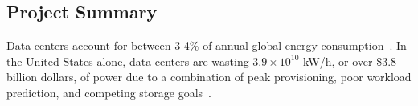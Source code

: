 
\subsection*{Project Summary}


Data centers account for between 3-4\% of annual global energy                                          
consumption~\cite{nrdc}.  In the United States alone, data centers are wasting                          
$3.9\times10^{10}$ kW/h, or over \$3.8 billion dollars, of power due to a                               
combination of peak provisioning, poor workload prediction, and competing
storage goals~\cite{masanet,nrdc}. 

